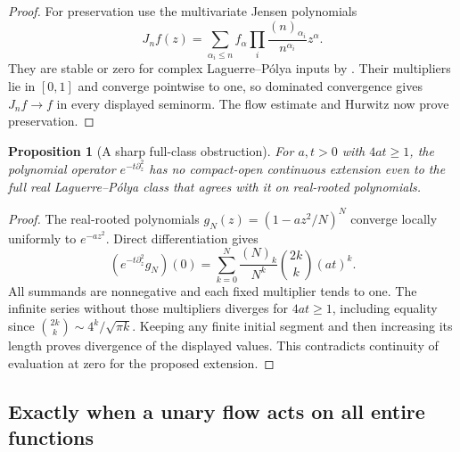 \documentclass[reqno]{amsart}
\newtheorem{proposition}[theorem]{Proposition}
\theoremstyle{definition}
\theoremstyle{remark}
\begin{document}
\begin{proof}
For preservation use the multivariate Jensen polynomials
\[
 J_nf(z)=\sum_{\alpha_i\le n}f_\alpha
               \prod_i\frac{(n)_{\alpha_i}}{n^{\alpha_i}}z^\alpha .
\]
They are stable or zero for complex Laguerre--P\'olya inputs by
\cite[Theorem 5.1 and Lemma 5.2]{BB09}.  Their multipliers lie in \([0,1]\)
and converge pointwise to one, so dominated convergence gives
\(J_nf\to f\) in every displayed seminorm.  The flow estimate and Hurwitz
now prove preservation.
\end{proof}

\begin{proposition}[A sharp full-class obstruction]\label{ana:gaussian-obstruction}
For \(a,t>0\) with \(4at\ge1\), the polynomial operator
\(e^{-t\partial_z^2}\) has no compact-open continuous extension even to
the full real Laguerre--P\'olya class that agrees with it on real-rooted
polynomials.
\end{proposition}
\begin{proof}
The real-rooted polynomials \(g_N(z)=(1-az^2/N)^N\) converge locally
uniformly to \(e^{-az^2}\).  Direct differentiation gives
\[
 (e^{-t\partial_z^2}g_N)(0)
 =\sum_{k=0}^N\frac{(N)_k}{N^k}\binom{2k}{k}(at)^k .
\]
All summands are nonnegative and each fixed multiplier tends to one.
The infinite series without those multipliers diverges for \(4at\ge1\),
including equality since \(\binom{2k}{k}\sim4^k/\sqrt{\pi k}\).
Keeping any finite initial segment and then increasing its length proves
divergence of the displayed values.  This contradicts continuity of
evaluation at zero for the proposed extension.
\end{proof}

\subsection{Exactly when a unary flow acts on all entire functions}
\end{document}
